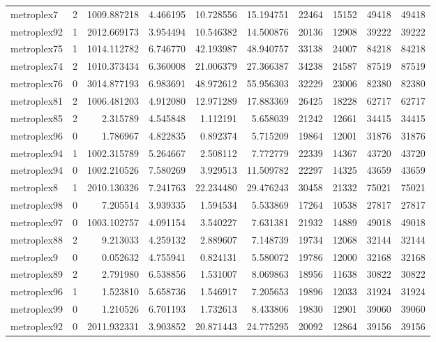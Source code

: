 \begin{longtable}{|l|r|r|r|r|r|r|r|r|r|}
metroplex7 & 2 & 1009.887218 & 4.466195 & 10.728556 & 15.194751 & 22464 & 15152 & 49418 & 49418 \\
metroplex92 & 1 & 2012.669173 & 3.954494 & 10.546382 & 14.500876 & 20136 & 12908 & 39222 & 39222 \\
metroplex75 & 1 & 1014.112782 & 6.746770 & 42.193987 & 48.940757 & 33138 & 24007 & 84218 & 84218 \\
metroplex74 & 2 & 1010.373434 & 6.360008 & 21.006379 & 27.366387 & 34238 & 24587 & 87519 & 87519 \\
metroplex76 & 0 & 3014.877193 & 6.983691 & 48.972612 & 55.956303 & 32229 & 23006 & 82380 & 82380 \\
metroplex81 & 2 & 1006.481203 & 4.912080 & 12.971289 & 17.883369 & 26425 & 18228 & 62717 & 62717 \\
metroplex85 & 2 & 2.315789 & 4.545848 & 1.112191 & 5.658039 & 21242 & 12661 & 34415 & 34415 \\
metroplex96 & 0 & 1.786967 & 4.822835 & 0.892374 & 5.715209 & 19864 & 12001 & 31876 & 31876 \\
metroplex94 & 1 & 1002.315789 & 5.264667 & 2.508112 & 7.772779 & 22339 & 14367 & 43720 & 43720 \\
metroplex94 & 0 & 1002.210526 & 7.580269 & 3.929513 & 11.509782 & 22297 & 14325 & 43659 & 43659 \\
metroplex8 & 1 & 2010.130326 & 7.241763 & 22.234480 & 29.476243 & 30458 & 21332 & 75021 & 75021 \\
metroplex98 & 0 & 7.205514 & 3.939335 & 1.594534 & 5.533869 & 17264 & 10538 & 27817 & 27817 \\
metroplex97 & 0 & 1003.102757 & 4.091154 & 3.540227 & 7.631381 & 21932 & 14889 & 49018 & 49018 \\
metroplex88 & 2 & 9.213033 & 4.259132 & 2.889607 & 7.148739 & 19734 & 12068 & 32144 & 32144 \\
metroplex9 & 0 & 0.052632 & 4.755941 & 0.824131 & 5.580072 & 19786 & 12000 & 32168 & 32168 \\
metroplex89 & 2 & 2.791980 & 6.538856 & 1.531007 & 8.069863 & 18956 & 11638 & 30822 & 30822 \\
metroplex96 & 1 & 1.523810 & 5.658736 & 1.546917 & 7.205653 & 19896 & 12033 & 31924 & 31924 \\
metroplex99 & 0 & 1.210526 & 6.701193 & 1.732613 & 8.433806 & 19830 & 12901 & 39060 & 39060 \\
metroplex92 & 0 & 2011.932331 & 3.903852 & 20.871443 & 24.775295 & 20092 & 12864 & 39156 & 39156 \\

\end{longtable}
